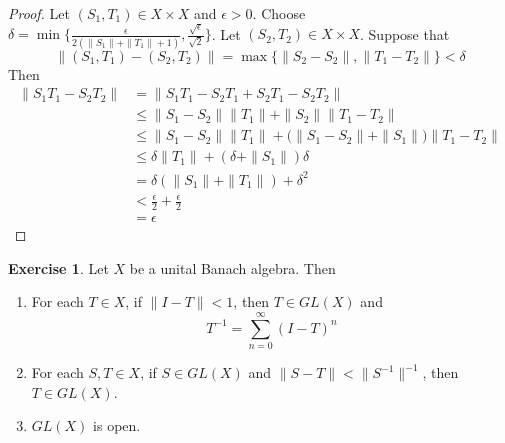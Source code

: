 \documentclass[12pt]{amsart}
\theoremstyle{definition}
\newtheorem{ex}[definition]{Exercise}
\newcommand{\del}{\delta}
\newcommand{\ep}{\epsilon}
\newcommand{\lex}[1]{\label{ex:#1}}
\begin{document}
	\begin{proof}
		Let $(S_1,T_1) \in X \times X$ and $\ep > 0$. Choose $\del = \min\{\frac{\ep}{2(\|S_1 \|+ \|T_1 \|+1)}, \frac{\sqrt{\ep}}{\sqrt{2}}\}$. Let $(S_2, T_2) \in X \times X$. Suppose that 
		$$\|(S_1, T_1) - (S_2, T_2) \|= \max \{ \|S_2 -S_2 \|, \|T_1 - T_2 \|\} < \del$$ 
		Then 
		\begin{align*}
			\|S_1T_1 - S_2T_2 \|
			&= \|S_1T_1 - S_2T_1 +S_2T_1 - S_2T_2 \|\\
			& \leq \|S_1 -S_2 \|\|T_1 \|+ \|S_2 \|\|T_1 - T_2 \|\\
			& \leq \|S_1 -S_2 \|\|T_1 \|+ \big( \|S_1-S_2 \|+ \|S_1 \|\big) \|T_1 - T_2 \|\\
			& \leq \del \|T_1 \|+(\del + \|S_1 \|) \del \\
			&= \del (\|S_1 \|+ \|T_1 \|) + \del^2 \\
			& < \frac{\ep}{2} + \frac{\ep}{2}\\
			&= \ep
		\end{align*}
	\end{proof}
	
	
	\begin{ex} \lex{}
		Let $X$ be a unital Banach algebra. Then 
		\begin{enumerate}
			\item For each $T \in X$, if $\|I- T \|< 1$, then $T \in GL(X)$ and $$T^{-1} = \sum_{n=0}^{\infty}(I-T)^n$$
			\item For each $S,T \in X$, if $S \in GL(X)$  and $\|S-T \|< \|S^{-1} \|^{-1}$, then $T \in GL(X)$. 
			\item $GL(X)$ is open.
		\end{enumerate}
	\end{ex}
	
\end{document}
